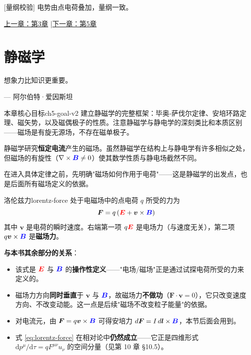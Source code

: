 \documentclass[11pt,a4paper,openany,oneside]{book}
\newcommand{\diff}{\mathrm{d}}
\newcommand{\vecE}{\textcolor{red}{\vect{E}}}
\newcommand{\vecB}{\textcolor{blue}{\vect{B}}}
\newcommand{\vect}[1]{\bm{#1}}
\newcommand{\curl}{\nabla\times}
\begin{document}
[量纲校验] 电势由点电荷叠加，量纲一致。\qedsymbol





\begin{center}\small \hyperlink{ch3-goal}{上一章：第3章} \quad|\quad \hyperlink{ch5-goal}{下一章：第5章}\end{center}

\chapter{静磁学}
\epigraph{想象力比知识更重要。}{--- 阿尔伯特·爱因斯坦}

\hypertarget{ch5-goal}{}\begin{insight}{本章核心目标}{ch5-goal-v2}
建立静磁学的完整框架：毕奥-萨伐尔定律、安培环路定理、磁矢势，以及磁偶极子的性质。注意静磁学与静电学的深刻类比和本质区别——磁场是有旋无源场，不存在磁单极子。
\end{insight}

静磁学研究\textbf{恒定电流}产生的磁场。虽然静磁学在结构上与静电学有许多相似之处，但磁场的有旋性（$\curl\vecB \neq 0$）使其数学性质与静电场截然不同。

在进入具体定律之前，先明确"磁场如何作用于电荷"——这是静磁学的出发点，也是后面所有磁场定义的依据。

\begin{theorem}{洛伦兹力}{lorentz-force}
处于电磁场中的点电荷 $q$ 所受的力为
\begin{equation}
\vect{F} = q\left(\vecE + \vect{v}\times\vecB\right)
\label{eq:lorentz-force}
\end{equation}
其中 $\vect{v}$ 是电荷的瞬时速度。右端第一项 $q\vecE$ 是电场力（与速度无关），第二项 $q\vect{v}\times\vecB$ 是\textbf{磁场力}。

\textbf{与本书其余部分的关系}：
\begin{itemize}[nosep]
\item 该式是 $\vecE$ 与 $\vecB$ 的\textbf{操作性定义}——"电场/磁场"正是通过试探电荷所受的力来定义的。
\item 磁场力方向\textbf{同时垂直}于 $\vect{v}$ 与 $\vecB$，故磁场力\textbf{不做功}（$\vect{F}\cdot\vect{v} = 0$），它只改变速度方向、不改变动能。这一点是后续"磁场不改变粒子能量"的依据。
\item 对电流元，由 $\vect{F} = q\vect{v}\times\vecB$ 可得安培力 $d\vect{F} = I\,d\vect{l}\times\vecB$，本节后面会用到。
\item 式 \eqref{eq:lorentz-force} 在相对论中\textbf{仍然成立}——它正是四维形式 $\diff p^\mu/\diff\tau = qF^{\mu\nu}u_\nu$ 的空间分量（见第 10 章 §10.5）。
\end{itemize}
\end{theorem}
\end{document}
